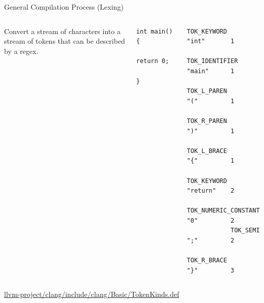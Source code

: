 \documentclass{beamer}
\begin{document}
\begin{frame}[fragile]{General Compilation Process (Lexing)}
    \begin{columns}[T,onlytextwidth]
            Convert a stream of characters into a stream of tokens that can be described by a regex.

            \vspace{1ex}
            \begin{lstlisting}[gobble=12]
            int main() {
                return 0;
            }
            \end{lstlisting}

            \begin{lstlisting}[gobble=12]
            TOK_KEYWORD          "int"       1
            TOK_IDENTIFIER       "main"      1
            TOK_L_PAREN          "("         1
            TOK_R_PAREN          ")"         1
            TOK_L_BRACE          "{"         1
            TOK_KEYWORD          "return"    2
            TOK_NUMERIC_CONSTANT "0"         2
            TOK_SEMI             ";"         2
            TOK_R_BRACE          "}"         3
            \end{lstlisting}

    \end{columns}
    {\footnotesize \url{llvm-project/clang/include/clang/Basic/TokenKinds.def}}
\end{frame}
\end{document}
